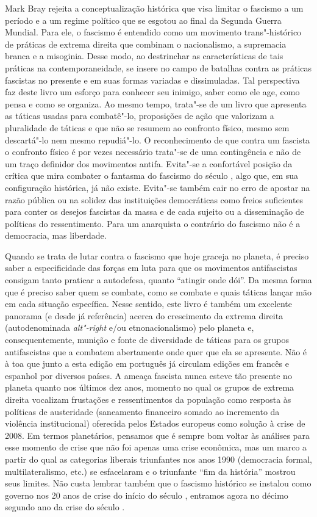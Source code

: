 Mark Bray rejeita a conceptualização histórica que visa limitar o
fascismo a um período e a um regime político que se esgotou ao final da
Segunda Guerra Mundial. Para ele, o fascismo é entendido como um
movimento trans"-histórico de práticas de extrema direita que combinam o
nacionalismo, a supremacia branca e a misoginia. Desse modo, ao
destrinchar as características de tais práticas na contemporaneidade, se
insere no campo de batalhas contra as práticas fascistas no presente e
em suas formas variadas e dissimuladas. Tal perspectiva faz deste
livro um esforço para conhecer seu inimigo, saber como ele age, como
pensa e como se organiza. Ao mesmo tempo, trata"-se de um livro que
apresenta as táticas usadas para combatê"-lo, proposições de ação que
valorizam a pluralidade de táticas e que não se resumem ao confronto
físico, mesmo sem descartá"-lo nem mesmo repudiá"-lo. O reconhecimento de
que contra um fascista o confronto físico é por vezes necessário
trata"-se de uma contingência e não de um traço definidor dos movimentos
antifa. Evita"-se a confortável posição da crítica que mira
combater o fantasma do fascismo do século , algo que, em sua
configuração histórica, já não existe. Evita"-se também cair no erro de
apostar na razão pública ou na solidez das instituições democráticas
como freios suficientes para conter os desejos fascistas da massa e de
cada sujeito ou a disseminação de políticas do ressentimento. Para um
anarquista o contrário do fascismo não é a democracia, mas liberdade.

Quando se trata de lutar contra o fascismo que hoje graceja no planeta,
é preciso saber a especificidade das forças em luta para que os
movimentos antifascistas consigam tanto praticar a autodefesa, quanto
``atingir onde dói''. Da mesma forma que é preciso saber quem se
combate, como se combate e quais táticas lançar mão em cada situação
específica. Nesse sentido, este livro é também um excelente panorama (e
desde já referência) acerca do crescimento da extrema direita
(autodenominada \emph{alt"-right} e/ou etnonacionalismo) pelo planeta e,
consequentemente, munição e fonte de diversidade de táticas para os
grupos antifascistas que a combatem abertamente onde quer que ela se
apresente. Não é à toa que junto a esta edição em português já circulam
edições em francês e espanhol por diversos países. A ameaça fascista
nunca esteve tão presente no planeta quanto nos últimos dez anos,
momento no qual os grupos de extrema direita vocalizam frustações e
ressentimentos da população como resposta às políticas de austeridade
(saneamento financeiro somado ao incremento da violência institucional)
oferecida pelos Estados europeus como solução à crise de 2008. Em termos
planetários, pensamos que é sempre bom voltar às análises para esse
momento de crise que não foi apenas uma crise econômica, mas um marco a
partir do qual as categorias liberais triunfantes nos anos 1990
(democracia formal, multilateralismo, etc.) se esfacelaram e o triunfante
``fim da história'' mostrou seus limites. Não custa lembrar também que o
fascismo histórico se instalou como governo nos 20 anos de crise do
início do século , entramos agora no décimo segundo ano da crise do
século .

